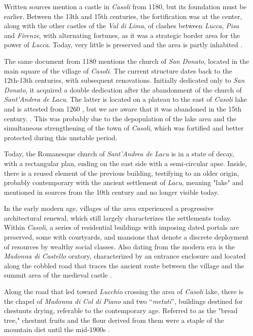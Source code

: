 \documentclass[sustainability,article,submit,pdftex,moreauthors]{Definitions/mdpi}
\begin{document}
Written sources mention a castle in \emph{Casoli} from 1180, but its foundation must be earlier. Between the 13th and 15th centuries, the fortification was at the center, along with the other castles of the \emph{Val di Lima}, of clashes between \emph{Lucca}, \textit{Pisa} and \emph{Firenze}, with alternating fortunes, as it was a strategic border area for the power of \emph{Lucca}. Today, very little is preserved and the area is partly inhabited \cite{gia96, for12, rom16}.

The same document from 1180 mentions the church of \textit{San Donato}, located in the main square of the village of \emph{Casoli}. The current structure dates back to the 12th-13th centuries, with subsequent renovations. Initially dedicated only to \textit{San Donato}, it acquired a double dedication after the abandonment of the church of \textit{Sant'Andrea de Lacu}. The latter is located on a plateau to the east of \emph{Casoli} lake and is attested from 1260 \cite{ber18, gia96, cap17}, but we are aware that it was abandoned in the 15th century. \cite{gia96, con12}. This was probably due to the depopulation of the lake area and the simultaneous strengthening of the town of \emph{Casoli}, which was fortified and better protected during this unstable period.

Today, the Romanesque church of \textit{Sant'Andrea de Lacu} is in a state of decay, with a rectangular plan, ending on the east side with a semi-circular apse. Inside, there is a reused element of the previous building, testifying to an older origin, probably contemporary with the ancient settlement of \textit{Lacu}, meaning "lake" and mentioned in sources from the 10th century and no longer visible today.

In the early modern age, villages of the area experienced a progressive architectural renewal, which still largely characterizes the settlements today. Within \emph{Casoli}, a series of residential buildings with imposing dated portals are preserved, some with courtyards, and mansions that denote a discrete deployment of resources by wealthy social classes. Also dating from the modern era is the \textit{Madonna di Castello} oratory, characterized by an entrance enclosure and located along the cobbled road that traces the ancient route between the village and the summit area of the medieval castle \cite{gia96}.

Along the road that led toward \textit{Lucchio} crossing the area of \emph{Casoli} lake, there is the chapel of \textit{Madonna di Col di Piano} and two “\textit{metati}”, buildings destined for chestnuts drying, referable to the contemporary age. Referred to as the "bread tree," chestnut fruits and the flour derived from them were a staple of the mountain diet until the mid-1900s \cite{buc92, puc10}.
\end{document}
